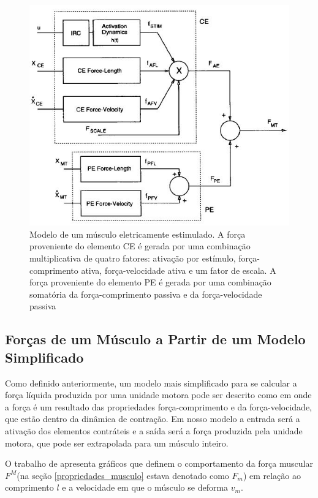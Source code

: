\begin{figure}[H]
\centering
\includegraphics[width = 1\textwidth]{img/Durfee1994_Modelo.JPG}
\caption[Exemplo de Modelo Simplificado para Obter as Forças dos Músculos]{Modelo de um músculo eletricamente estimulado. A força proveniente do elemento CE é gerada por uma combinação multiplicativa de quatro fatores: ativação por estímulo, força-comprimento ativa, força-velocidade ativa e um fator de escala. A força proveniente do elemento PE é gerada por uma combinação somatória da força-comprimento passiva e da força-velocidade passiva 
\cite{durfee1994estimation}}
\label{modelo_durfee}
\end{figure}


\subsection{Forças de um Músculo a Partir de um Modelo Simplificado}
Como definido anteriormente, um modelo mais simplificado para se calcular a força líquida produzida por uma unidade motora pode ser descrito como em \cite{zajac1989muscle} onde a força é um resultado das propriedades força-comprimento e da força-velocidade, que estão dentro da dinâmica de contração. Em nosso modelo a entrada será a ativação dos elementos contráteis e a saída será a força produzida pela unidade motora, que pode ser extrapolada para um músculo inteiro.

O trabalho de \cite{zajac1989muscle} apresenta gráficos que definem o comportamento da força muscular $F^M$(na seção \ref{propriedades_musculo} estava denotado como $F_m$) em relação ao comprimento $l$ e a velocidade em que o músculo se deforma $v_m$. 

